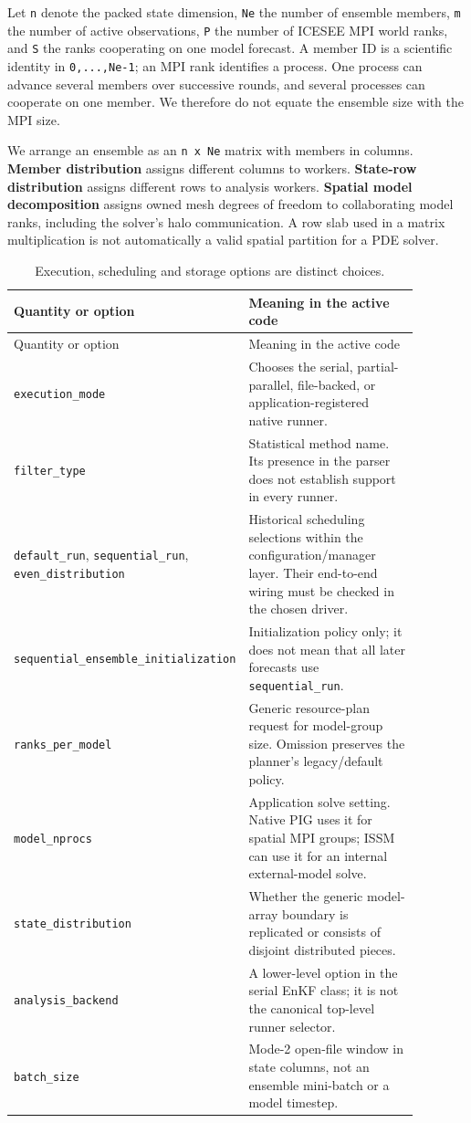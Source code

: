 \documentclass[11pt,a4paper]{article}
\newcommand{\code}[1]{\nolinkurl{#1}}
\begin{document}
Let \code{n} denote the packed state dimension, \code{Ne} the number of ensemble members, \code{m} the number of active observations, \code{P} the number of ICESEE MPI world ranks, and \code{S} the ranks cooperating on one model forecast. A member ID is a scientific identity in \code{0,...,Ne-1}; an MPI rank identifies a process. One process can advance several members over successive rounds, and several processes can cooperate on one member. We therefore do not equate the ensemble size with the MPI size.

We arrange an ensemble as an \code{n x Ne} matrix with members in columns. \textbf{Member distribution} assigns different columns to workers. \textbf{State-row distribution} assigns different rows to analysis workers. \textbf{Spatial model decomposition} assigns owned mesh degrees of freedom to collaborating model ranks, including the solver's halo communication. A row slab used in a matrix multiplication is not automatically a valid spatial partition for a PDE solver.

\begingroup\small\setlength{\tabcolsep}{3pt}
\begin{longtable}{p{0.31\linewidth}p{0.57\linewidth}}
\caption{Execution, scheduling and storage options are distinct choices.}\label{tab:selectors}\\
\toprule
Quantity or option & Meaning in the active code\\\midrule\endfirsthead
\toprule Quantity or option & Meaning in the active code\\\midrule\endhead
\code{execution_mode} & Chooses the serial, partial-parallel, file-backed, or application-registered native runner.\\
\code{filter_type} & Statistical method name. Its presence in the parser does not establish support in every runner.\\
\code{default_run}, \code{sequential_run}, \code{even_distribution} & Historical scheduling selections within the configuration/manager layer. Their end-to-end wiring must be checked in the chosen driver.\\
\code{sequential_ensemble_initialization} & Initialization policy only; it does not mean that all later forecasts use \code{sequential_run}.\\
\code{ranks_per_model} & Generic resource-plan request for model-group size. Omission preserves the planner's legacy/default policy.\\
\code{model_nprocs} & Application solve setting. Native PIG uses it for spatial MPI groups; ISSM can use it for an internal external-model solve.\\
\code{state_distribution} & Whether the generic model-array boundary is replicated or consists of disjoint distributed pieces.\\
\code{analysis_backend} & A lower-level option in the serial EnKF class; it is not the canonical top-level runner selector.\\
\code{batch_size} & Mode-2 open-file window in state columns, not an ensemble mini-batch or a model timestep.\\
\bottomrule\end{longtable}\endgroup
\end{document}
